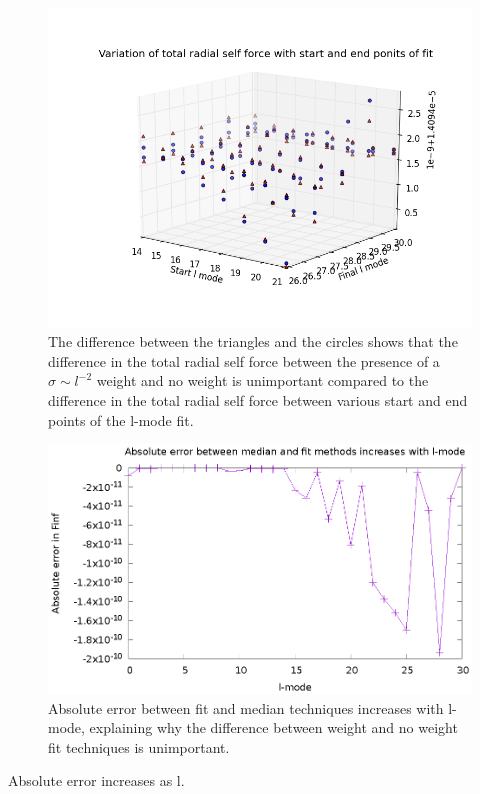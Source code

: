 \begin{figure}
  \includegraphics{3Dscatterwithwithoutsigmalminlmax}
  \caption{The difference between the triangles and the circles shows that the difference in the total radial self force between the presence of a $\sigma\sim l^{-2}$ weight and no weight is unimportant compared to the difference in the total radial self force between various start and end points of the l-mode fit.}
\end{figure}

\begin{figure}
  \includegraphics{absErrorIncreaseslmode}
  \caption{Absolute error between fit and median techniques increases with l-mode, explaining why the difference between weight and no weight fit techniques is unimportant.}
\end{figure}

Absolute error increases as l. 
